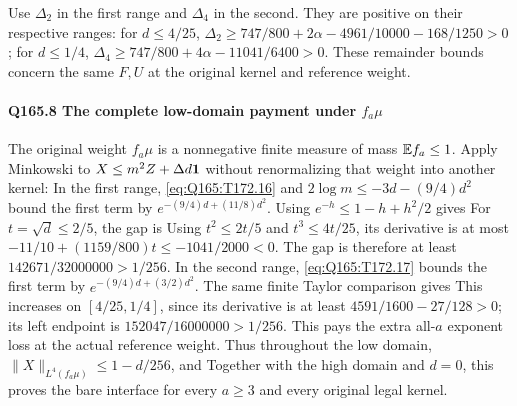 Use $\Delta_2$ in the first range and $\Delta_4$ in the second.
They are positive on their respective ranges:
for $d\le\allowbreak 4/25$,
$\Delta_2\ge\allowbreak 747/800+2\alpha-4961/10000-168/1250>\allowbreak 0$;
for $d\le\allowbreak 1/4$,
$\Delta_4\ge\allowbreak 747/800+4\alpha-11041/6400>\allowbreak 0$.
These remainder bounds concern the same $F,\allowbreak U$ at the original kernel
and reference weight.

\paragraph{Q165.8 The complete low-domain payment under $f_a\mu$}\label{part:Q165.8}
The original weight $f_a\mu$ is a nonnegative finite measure of mass
$\mathbb E f_a\le\allowbreak 1$. Apply Minkowski to $X\le\allowbreak  m^2Z+\Delta d\mathbf1$ without
renormalizing that weight into another kernel:
In the first range, \eqref{eq:Q165:T172.16} and
$2\log m\le\allowbreak -3d-(9/4)d^2$ bound the first term by
$e^{-(9/4)d+(11/8)d^2}$.
Using $e^{-h}\le\allowbreak 1-h+h^2/2$ gives
For $t=\allowbreak \sqrt d\le\allowbreak 2/5$, the gap is
Using $t^2\le\allowbreak 2t/5$ and $t^3\le\allowbreak 4t/25$, its derivative is at most
$-11/10+(1159/800)t\le\allowbreak -1041/2000<\allowbreak 0$.
The gap is therefore at least $142671/32000000>\allowbreak 1/256$.
In the second range, \eqref{eq:Q165:T172.17} bounds the first term
by $e^{-(9/4)d+(3/2)d^2}$. The same finite Taylor comparison gives
This increases on $[4/25,\allowbreak 1/4]$, since its derivative is at least
$4591/1600-27/128>\allowbreak 0$; its left endpoint is
$152047/16000000>\allowbreak 1/256$.
This pays the extra all-$a$ exponent loss at the actual reference weight.
Thus throughout the low domain,
$\|X\|_{L^4(f_a\mu)}\le\allowbreak 1-d/256$, and
Together with the high domain and $d=\allowbreak 0$, this proves the bare interface
for every $a\ge\allowbreak 3$ and every original legal kernel.

